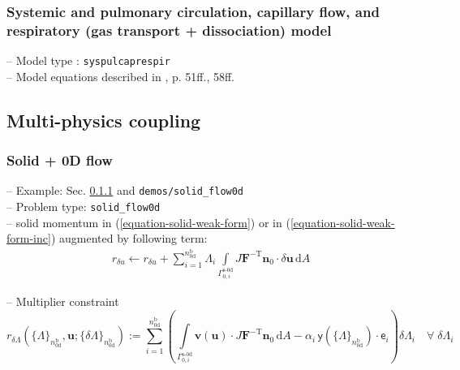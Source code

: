 \documentclass[a4paper,12pt]{report}
\begin{document}
\subsubsection{Systemic and pulmonary circulation, capillary flow, and respiratory (gas transport + dissociation) model}

-- Model type : \verb"syspulcaprespir"\\

-- Model equations described in \cite{hirschvogel2019disspub}, p. 51ff., 58ff.


\subsection{Multi-physics coupling}\label{multi-physics-coupling}

\subsubsection{Solid + 0D flow}\label{solid-0d-flow}

-- Example: Sec. \ref{solid-0d-flow} and \verb"demos/solid_flow0d"\\

-- Problem type: \verb"solid_flow0d"\\

-- solid momentum in (\ref{equation-solid-weak-form}) or in (\ref{equation-solid-weak-form-inc}) augmented by following term:
\begin{equation}
\begin{aligned}
r_{\delta u} \leftarrow r_{\delta u} + \sum\limits_{i=1}^{{n}_{\text{0d}}^{\text{b}}}\mathit{\Lambda}_{i}\int\limits_{\mathit{\Gamma}_{0,i}^{\text{s-0d}}} J\boldsymbol{F}^{-\mathrm{T}}\boldsymbol{n}_{0}\cdot\delta\boldsymbol{u}\,\mathrm{d}A
\end{aligned}
\end{equation}

-- Multiplier constraint
\begin{equation}
r_{\delta\mathit{\Lambda}}\left(\{\mathit{\Lambda}\}_{n_{\text{0d}}^{\text{b}}},\boldsymbol{u};\{\delta\mathit{\Lambda}\}_{n_{\text{0d}}^{\text{b}}}\right) := \sum\limits_{i=1}^{n_{\text{0d}}^{\text{b}}}\left(\int\limits_{\mathit{\Gamma}_{0,i}^{\text{s-0d}}} \boldsymbol{v}(\boldsymbol{u})\cdot J\boldsymbol{F}^{-\mathrm{T}}\boldsymbol{n}_{0}\,\mathrm{d}A - \alpha_{i} \,\boldsymbol{\mathsf{y}}\left(\{\mathit{\Lambda}\}_{n_{\text{0d}}^{\text{b}}}\right)\cdot\boldsymbol{\mathsf{e}}_{i}\right)\delta\mathit{\Lambda}_{i} \quad \forall \; \delta\mathit{\Lambda}_i
\end{equation}
\end{document}
